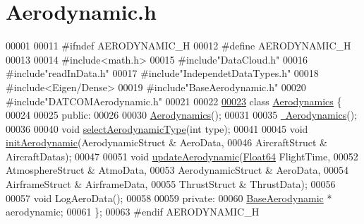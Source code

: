 \hypertarget{_aerodynamic_8h_source}{}\section{Aerodynamic.\+h}
\label{_aerodynamic_8h_source}

\begin{DoxyCode}
00001 
00011 \textcolor{preprocessor}{#ifndef AERODYNAMIC\_H}
00012 \textcolor{preprocessor}{#define AERODYNAMIC\_H}
00013 
00014 \textcolor{preprocessor}{#include<math.h>}
00015 \textcolor{preprocessor}{#include"DataCloud.h"}
00016 \textcolor{preprocessor}{#include"readInData.h"}
00017 \textcolor{preprocessor}{#include"IndependetDataTypes.h"}
00018 \textcolor{preprocessor}{#include<Eigen/Dense>}
00019 \textcolor{preprocessor}{#include"BaseAerodynamic.h"}
00020 \textcolor{preprocessor}{#include"DATCOMAerodynamic.h"}
00021 
00022 
\hyperlink{group___aerodynamic}{00023} \textcolor{keyword}{class }\hyperlink{group___aerodynamic_class_aerodynamics}{Aerodynamics} \{
00024 
00025 \textcolor{keyword}{public}:
00026 
00030     \hyperlink{group___aerodynamic_a36c7ae850ce18605cdbf3ce1709d8e54}{Aerodynamics}();
00031 
00035     \hyperlink{group___aerodynamic_af0e048e0c80ec8334997b79b761fea60}{~Aerodynamics}();
00036 
00040     \textcolor{keywordtype}{void} \hyperlink{group___aerodynamic_a9aa3397e8b1d91ed237146a57bbe6bcf}{selectAerodynamicType}(\textcolor{keywordtype}{int} type);
00041 
00045     \textcolor{keywordtype}{void} \hyperlink{group___aerodynamic_aa4fee96e5b485cac47b3bc2127a6d4e2}{initAerodynamic}(AerodynamicStruct & AeroData, 
00046                          AircraftStruct & AircraftDatas);
00047 
00051     \textcolor{keywordtype}{void} \hyperlink{group___aerodynamic_adf6047b063022ff3b689e269d2b35863}{updateAerodynamic}(\hyperlink{group___tools_ga3f1431cb9f76da10f59246d1d743dc2c}{Float64} FlightTime,
00052                             AtmosphereStruct & AtmoData,
00053                             AerodynamicStruct & AeroData,
00054                             AirframeStruct & AirframeData,
00055                             ThrustStruct & ThrustData);
00056 
00057     \textcolor{keywordtype}{void} LogAeroData();
00058 
00059 \textcolor{keyword}{private}:
00060     \hyperlink{group___aerodynamic_class_base_aerodynamic}{BaseAerodynamic} * aerodynamic;
00061 \};
00063 \textcolor{preprocessor}{#endif  AERODYNAMIC\_H}
\end{DoxyCode}
